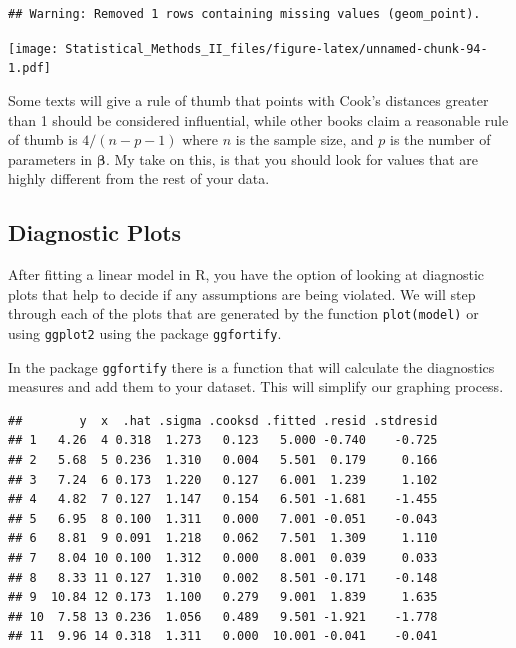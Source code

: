 \documentclass[]{book}
\newenvironment{Shaded}{\begin{snugshade}}{\end{snugshade}}
\newcommand{\KeywordTok}[1]{\textcolor[rgb]{0.13,0.29,0.53}{\textbf{{#1}}}}
\newcommand{\DataTypeTok}[1]{\textcolor[rgb]{0.13,0.29,0.53}{{#1}}}
\newcommand{\DecValTok}[1]{\textcolor[rgb]{0.00,0.00,0.81}{{#1}}}
\newcommand{\StringTok}[1]{\textcolor[rgb]{0.31,0.60,0.02}{{#1}}}
\newcommand{\CommentTok}[1]{\textcolor[rgb]{0.56,0.35,0.01}{\textit{{#1}}}}
\newcommand{\NormalTok}[1]{{#1}}
\theoremstyle{definition}
\theoremstyle{definition}
\theoremstyle{remark}
\begin{document}
\begin{verbatim}
## Warning: Removed 1 rows containing missing values (geom_point).
\end{verbatim}

\texttt{[image: Statistical\_Methods\_II\_files/figure-latex/unnamed-chunk-94-1.pdf]}

Some texts will give a rule of thumb that points with Cook's distances
greater than 1 should be considered influential, while other books claim
a reasonable rule of thumb is \(4/\left(n-p-1\right)\) where \(n\) is
the sample size, and \(p\) is the number of parameters in
\(\boldsymbol{\beta}\). My take on this, is that you should look for
values that are highly different from the rest of your data.

\subsection{Diagnostic Plots}\label{diagnostic-plots}

After fitting a linear model in R, you have the option of looking at
diagnostic plots that help to decide if any assumptions are being
violated. We will step through each of the plots that are generated by
the function \texttt{plot(model)} or using \texttt{ggplot2} using the
package \texttt{ggfortify}.

In the package \texttt{ggfortify} there is a function that will
calculate the diagnostics measures and add them to your dataset. This
will simplify our graphing process.

\begin{Shaded}
\end{Shaded}

\begin{verbatim}
##        y  x  .hat .sigma .cooksd .fitted .resid .stdresid
## 1   4.26  4 0.318  1.273   0.123   5.000 -0.740    -0.725
## 2   5.68  5 0.236  1.310   0.004   5.501  0.179     0.166
## 3   7.24  6 0.173  1.220   0.127   6.001  1.239     1.102
## 4   4.82  7 0.127  1.147   0.154   6.501 -1.681    -1.455
## 5   6.95  8 0.100  1.311   0.000   7.001 -0.051    -0.043
## 6   8.81  9 0.091  1.218   0.062   7.501  1.309     1.110
## 7   8.04 10 0.100  1.312   0.000   8.001  0.039     0.033
## 8   8.33 11 0.127  1.310   0.002   8.501 -0.171    -0.148
## 9  10.84 12 0.173  1.100   0.279   9.001  1.839     1.635
## 10  7.58 13 0.236  1.056   0.489   9.501 -1.921    -1.778
## 11  9.96 14 0.318  1.311   0.000  10.001 -0.041    -0.041
\end{verbatim}
\end{document}
